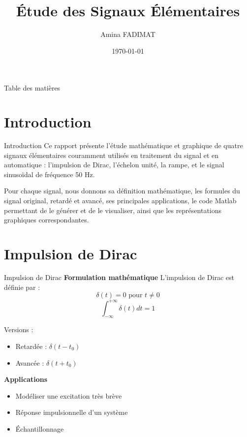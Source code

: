 \documentclass[10pt]{beamer}
\title{Étude des Signaux Élémentaires}
\author{Amina FADIMAT}
\date{\today}
\begin{document}
	
	\begin{frame}
	\titlepage
\end{frame}

\begin{frame}{Table des matières}
\tableofcontents
\end{frame}

\section{Introduction}
\begin{frame}{Introduction}
Ce rapport présente l'étude mathématique et graphique de quatre signaux élémentaires couramment utilisés en traitement du signal et en automatique : l'impulsion de Dirac, l'échelon unité, la rampe, et le signal sinusoïdal de fréquence 50 Hz. 

Pour chaque signal, nous donnons sa définition mathématique, les formules du signal original, retardé et avancé, ses principales applications, le code Matlab permettant de le générer et de le visualiser, ainsi que les représentations graphiques correspondantes.
\end{frame}

\section{Impulsion de Dirac}
\begin{frame}{Impulsion de Dirac}
\textbf{Formulation mathématique}
L'impulsion de Dirac est définie par :
$$\delta(t)=0 \text{ pour } t\ne0$$
$$\int_{-\infty}^{+\infty}\delta(t)dt=1$$

Versions :
\begin{itemize}
\item Retardée : $\delta(t-t_{0})$
\item Avancée : $\delta(t+t_{0})$
\end{itemize}

\textbf{Applications}
\begin{itemize}
\item Modéliser une excitation très brève
\item Réponse impulsionnelle d'un système
\item Échantillonnage
\end{itemize}
\end{frame}
\end{document}
